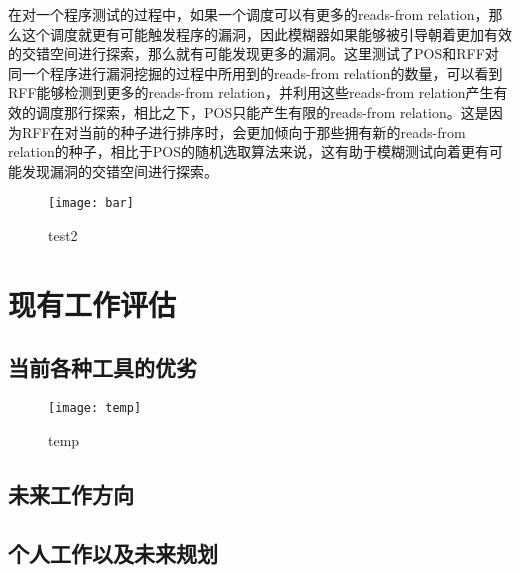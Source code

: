 在对一个程序测试的过程中，如果一个调度可以有更多的reads-from relation，那么这个调度就更有可能触发程序的漏洞，因此模糊器如果能够被引导朝着更加有效的交错空间进行探索，那么就有可能发现更多的漏洞。这里测试了POS和RFF对同一个程序进行漏洞挖掘的过程中所用到的reads-from relation的数量，可以看到RFF能够检测到更多的reads-from relation，并利用这些reads-from relation产生有效的调度那行探索，相比之下，POS只能产生有限的reads-from relation。这是因为RFF在对当前的种子进行排序时，会更加倾向于那些拥有新的reads-from relation的种子，相比于POS的随机选取算法来说，这有助于模糊测试向着更有可能发现漏洞的交错空间进行探索。

\begin{figure}[ht]
    \centering
    \texttt{[image: bar]}
    \caption{\label{fig:test2}test2}
\end{figure}

\section{现有工作评估}

\subsection{当前各种工具的优劣}

\begin{figure}[ht]
    \centering
    \texttt{[image: temp]}
    \caption{\label{fig:temp}temp}
\end{figure}

\subsection{未来工作方向}
\subsection{个人工作以及未来规划}